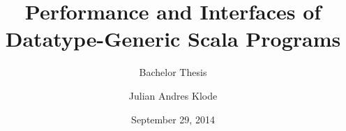 \documentclass[abstracton,parskip=half,oneside,open=right]{scrreprt}
\author{Julian Andres Klode}
\title{Performance and Interfaces of Datatype-Generic Scala Programs}
\subtitle{Bachelor Thesis}
\date{September 29, 2014}
\begin{document}
    \maketitle{}
\end{document}
